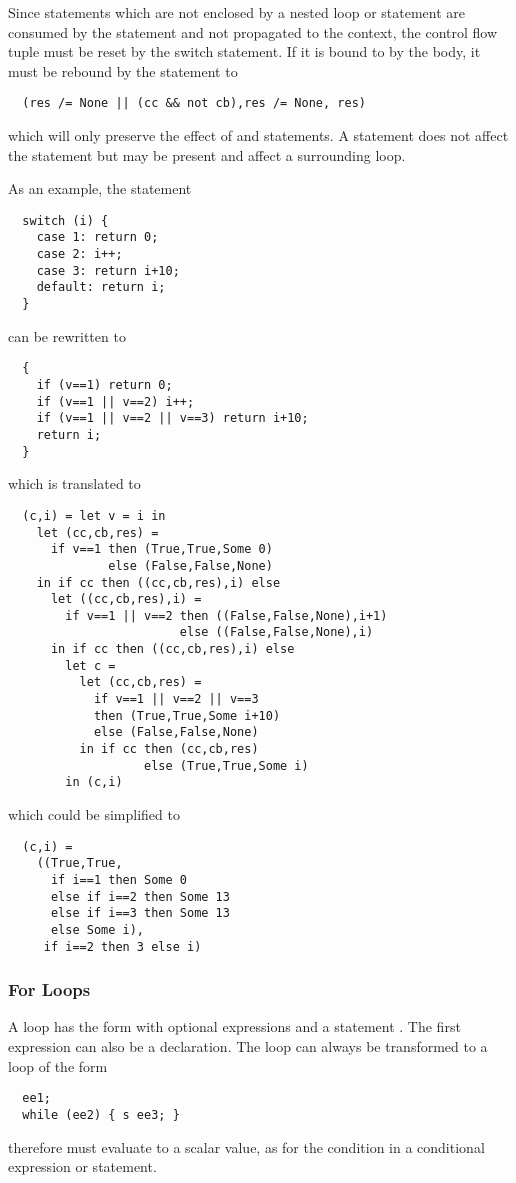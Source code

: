Since  statements which are not enclosed by a nested loop or  statement are consumed by the 
statement and not propagated to the context, the control flow tuple must be reset by the switch statement. If it is bound to
 by the body, it must be rebound by the  statement to
\begin{verbatim}
  (res /= None || (cc && not cb),res /= None, res)
\end{verbatim}
which will only preserve the effect of  and  statements. A  statement does not 
affect the  statement but may be present and affect a surrounding loop.

As an example, the  statement
\begin{verbatim}
  switch (i) {
    case 1: return 0;
    case 2: i++;
    case 3: return i+10;
    default: return i;
  }
\end{verbatim}
can be rewritten to
\begin{verbatim}
  {
    if (v==1) return 0;
    if (v==1 || v==2) i++;
    if (v==1 || v==2 || v==3) return i+10;
    return i;
  }
\end{verbatim}
which is translated to
\begin{verbatim}
  (c,i) = let v = i in
    let (cc,cb,res) = 
      if v==1 then (True,True,Some 0)
              else (False,False,None)
    in if cc then ((cc,cb,res),i) else 
      let ((cc,cb,res),i) = 
        if v==1 || v==2 then ((False,False,None),i+1)
                        else ((False,False,None),i)
      in if cc then ((cc,cb,res),i) else 
        let c = 
          let (cc,cb,res) = 
            if v==1 || v==2 || v==3 
            then (True,True,Some i+10)
            else (False,False,None)
          in if cc then (cc,cb,res)
                   else (True,True,Some i)
        in (c,i)
\end{verbatim}
which could be simplified to
\begin{verbatim}
  (c,i) = 
    ((True,True,
      if i==1 then Some 0
      else if i==2 then Some 13
      else if i==3 then Some 13
      else Some i),
     if i==2 then 3 else i)
\end{verbatim}

\subsubsection{For Loops}

A  loop has the form  with optional expressions  and a statement . 
The first expression  can also be a declaration. The  loop can always be transformed to a 
loop of the form
\begin{verbatim}
  ee1;
  while (ee2) { s ee3; }
\end{verbatim}
therefore  must evaluate to a scalar value, as for the condition in a conditional expression or statement.

